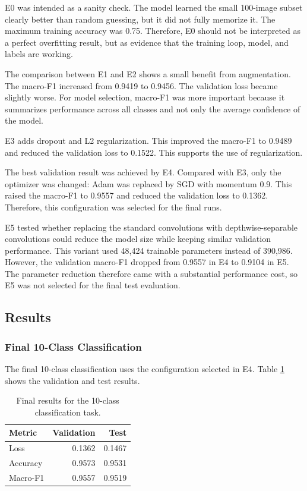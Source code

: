 E0 was intended as a sanity check. The model learned the small 100-image subset
clearly better than random guessing, but it did not fully memorize it. The
maximum training accuracy was 0.75. Therefore, E0 should not be interpreted as
a perfect overfitting result, but as evidence that the training loop, model,
and labels are working.

The comparison between E1 and E2 shows a small benefit from augmentation. The
macro-F1 increased from 0.9419 to 0.9456. The validation loss became slightly
worse. For model selection, macro-F1 was more important because it summarizes
performance across all classes and not only the average confidence of the
model.

E3 adds dropout and L2 regularization. This improved the macro-F1 to 0.9489 and
reduced the validation loss to 0.1522. This supports the use of
regularization.

The best validation result was achieved by E4. Compared with E3, only the
optimizer was changed: Adam was replaced by SGD with momentum 0.9. This raised
the macro-F1 to 0.9557 and reduced the validation loss to 0.1362. Therefore,
this configuration was selected for the final runs.

E5 tested whether replacing the standard convolutions with depthwise-separable
convolutions could reduce the model size while keeping similar validation
performance. This variant used 48,424 trainable parameters instead of 390,986.
However, the validation macro-F1 dropped from 0.9557 in E4 to 0.9104 in E5.
The parameter reduction therefore came with a substantial performance cost, so
E5 was not selected for the final test evaluation.

\subsection{Results}

\subsubsection{Final 10-Class Classification}

The final 10-class classification uses the configuration selected in E4. Table
\ref{tab:final_multiclass} shows the validation and test results.

\begin{table}[H]
\centering
\caption{Final results for the 10-class classification task.}
\label{tab:final_multiclass}
\begin{tabular}{lrr}
\toprule
Metric & Validation & Test \\
\midrule
Loss & 0.1362 & 0.1467 \\
Accuracy & 0.9573 & 0.9531 \\
Macro-F1 & 0.9557 & 0.9519 \\
\bottomrule
\end{tabular}
\end{table}

